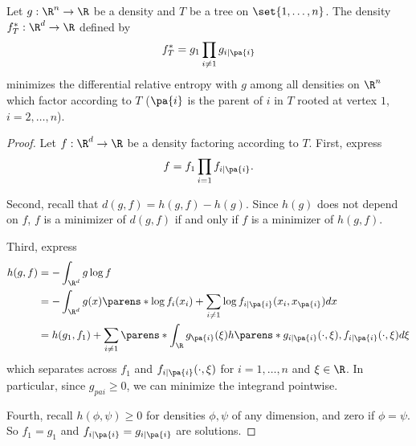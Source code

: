 \begin{prop}

Let $g: \R^n \to \R$ be a density and $T$ be a tree on $\set{1, \dots, n}$.
The density $f^*_T: \R^d \to \R$ defined by
$$
  f^*_T = g_1 \prod_{i \neq 1} g_{i \mid \pa{i}}
$$
minimizes the differential relative entropy with $g$ among all densities on $\R^n$ which factor according to $T$ ($\pa{i}$ is the parent of $i$ in $T$ rooted at vertex $1$, $i = 2, \dots, n$).

\begin{proof}

Let $f: \R^d \to \R$ be a density factoring according to $T$.
First, express
$$
  f = f_1 \prod_{i = 1} f_{i \mid \pa{i}}.
$$

Second, recall that $d(g, f) = h(g, f) - h(g)$.
Since $h(g)$ does not depend on $f$, $f$ is a minimizer of $d(g, f)$ if and only if $f$ is a minimizer of $h(g, f)$.

Third, express
$$
\begin{aligned}
  h(g, f) &= - \int_{\R^d} g \log f \\
          &= - \int_{\R^d} g(x) \parens*{ \log f_{i}(x_i) + \sum_{i \neq 1} \log f_{i \mid \pa{i}}(x_i, x_{\pa{i}})} dx \\
          &= h(g_1, f_1) + \sum_{i \neq 1} \parens*{ \int_{\R} g_{\pa{i}}(\xi) h\parens*{g_{i \mid \pa{i}}(\cdot, \xi), f_{i\mid\pa{i}}(\cdot,\xi)}d\xi}
\end{aligned}
$$
which separates across $f_1$ and $f_{i \mid \pa{i}}(\cdot, \xi)$ for $i = 1, \dots, n$ and $\xi \in \R$.
In particular, since $g_{pa{i}} \geq 0$,
we can minimize the integrand pointwise.

Fourth, recall $h(\phi, \psi) \geq 0$ for densities $\phi, \psi$ of any dimension, and zero if $\phi = \psi$.
So $f_1 = g_1$ and $f_{i \mid \pa{i}} = g_{i \mid \pa{i}}$ are solutions.

\end{proof}

\end{prop}

\strats
